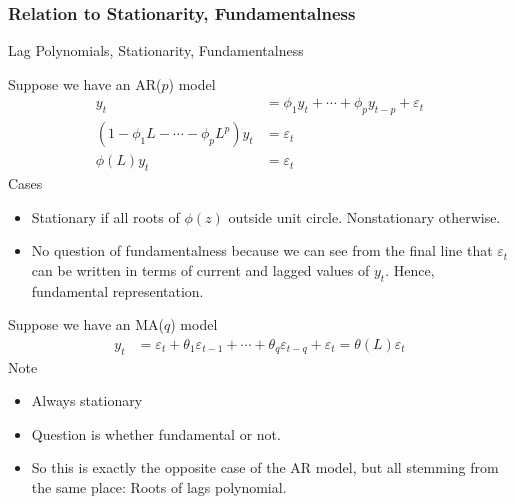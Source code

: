 \documentclass[aspectratio=169, handout]{beamer}
\begin{document}
\subsubsection{Relation to Stationarity, Fundamentalness}

{\scriptsize
\begin{frame}{Lag Polynomials, Stationarity, Fundamentalness}

Suppose we have an AR($p$) model
\begin{align*}
  y_t &= \phi_1 y_t + \cdots + \phi_p y_{t-p} + \varepsilon_t
  \\
  (1-\phi_1 L - \cdots - \phi_pL^p)y_t &= \varepsilon_t
  \\
  \phi(L)y_t &= \varepsilon_t
\end{align*}
Cases
\begin{itemize}
  \item \alert{Stationary} if all roots of $\phi(z)$ outside unit
    circle. Nonstationary otherwise.
  \item No question of fundamentalness because we can see from the final
    line that $\varepsilon_t$ can be written in terms of current and
    lagged values of $y_t$.
    Hence, fundamental representation.
\end{itemize}
Suppose we have an MA($q$) model
\begin{align*}
  y_t &= \varepsilon_t + \theta_1\varepsilon_{t-1} + \cdots + \theta_q
  \varepsilon_{t-q} + \varepsilon_t
  = \theta(L)\varepsilon_t
\end{align*}
Note
\begin{itemize}
  \item Always stationary
  \item Question is whether fundamental or not.
  \item So this is exactly the opposite case of the AR model, but all
    stemming from the same place: Roots of lags polynomial.
\end{itemize}
\end{frame}
}
\end{document}
